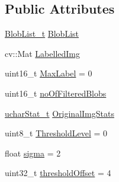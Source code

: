 \subsection*{Public Attributes}
\begin{DoxyCompactItemize}
\item 
\hyperlink{class_vision_1_1_segment_a60e08251e2ab94239e245044c31cde51}{Blob\+List\+\_\+t} \hyperlink{class_vision_1_1_segment_a74e0600a7dd49bd7110ee27bb4cd6e0e}{Blob\+List}
\item 
cv\+::\+Mat \hyperlink{class_vision_1_1_segment_a4daa143f6cd4a753d3bbe45c6a67d27f}{Labelled\+Img}
\item 
uint16\+\_\+t \hyperlink{class_vision_1_1_segment_a22d2a688de65f4d25b164f8b2a03f4a9}{Max\+Label} = 0
\item 
uint16\+\_\+t \hyperlink{class_vision_1_1_segment_a97077da3a144e800073bc06f5d4722d4}{no\+Of\+Filtered\+Blobs}
\item 
\hyperlink{_stats_8h_a5b876b087ada3df30b8dd6309fc25191}{uchar\+Stat\+\_\+t} \hyperlink{class_vision_1_1_segment_ab35cfe5504de7e5ea327991468e6cf3b}{Original\+Img\+Stats}
\item 
uint8\+\_\+t \hyperlink{class_vision_1_1_segment_a44f45a7d08ba6fed38e5c31bc9108291}{Threshold\+Level} = 0
\item 
float \hyperlink{class_vision_1_1_segment_a0d2c607a6064d8d8fea925fc7bfbbc53}{sigma} = 2
\item 
uint32\+\_\+t \hyperlink{class_vision_1_1_segment_a1338fc42ead26c6b1dd661f4281f5674}{threshold\+Offset} = 4
\end{DoxyCompactItemize}
